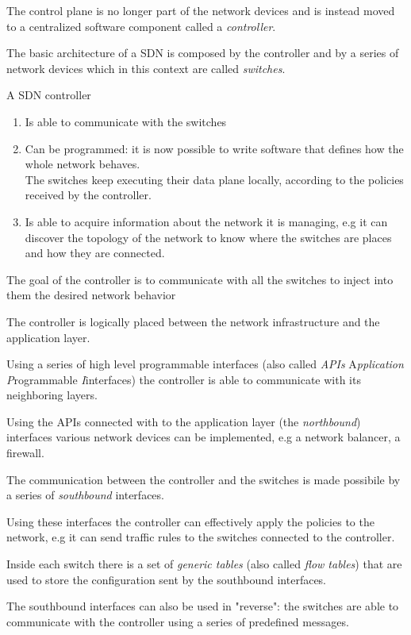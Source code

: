 The control plane is no longer part of the network devices and is instead moved to a  centralized software component called a \textit{controller}.

The basic architecture of a SDN is composed by the controller and by a series of network devices which in this context are called \textit{switches}.


A SDN controller

\begin{enumerate}
	\item Is able to communicate with the switches
	\item Can be programmed: it is now possible to write software that defines how the whole network behaves. \\
	The switches keep executing their data plane locally, according to the policies received by the controller.
	\item Is able to acquire information about the network it is managing, e.g it can discover the topology of the network to know where the switches are places and how they are connected.
\end{enumerate}

The goal of the controller is to communicate with all the switches to inject into them the desired network behavior

The controller is logically placed between the network infrastructure and the application layer.

Using a series of high level programmable interfaces  (also called \textit{APIs} A\textit{pplication} \textit{P}rogrammable \textit{I}interfaces) the controller is able to communicate with its neighboring layers.


Using the APIs connected with to the application layer (the \textit{northbound}) interfaces various network devices can be implemented, e.g a network balancer, a firewall.

The communication between the controller and the switches is made possibile by a series of \textit{southbound} interfaces.

Using these interfaces the controller can effectively apply the policies to the network, e.g it can send traffic rules to the switches connected to the controller.

Inside each switch there is a set of \textit{generic tables} (also called \textit{flow tables}) that are used to store the configuration sent by the southbound interfaces.

The southbound interfaces can also be used in "reverse": the switches are able to communicate with the controller using a series of predefined messages.

